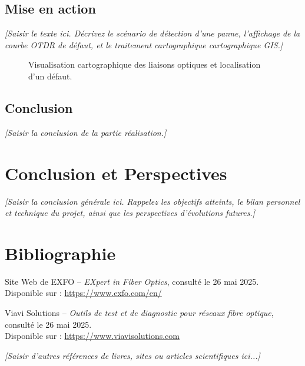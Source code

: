 \documentclass[11pt,a4paper]{article}
\begin{document}
\subsection{Mise en action}
\textit{[Saisir le texte ici. Décrivez le scénario de détection d'une panne, l'affichage de la courbe OTDR de défaut, et le traitement cartographique cartographique GIS.]}

\begin{figure}[H]
    \centering
    \caption{Visualisation cartographique des liaisons optiques et localisation d'un défaut.}
    \label{fig:map}
\end{figure}

\subsection{Conclusion}
\textit{[Saisir la conclusion de la partie réalisation.]}

\newpage

\section{Conclusion et Perspectives}
\textit{[Saisir la conclusion générale ici. Rappelez les objectifs atteints, le bilan personnel et technique du projet, ainsi que les perspectives d'évolutions futures.]}

\newpage

\section*{Bibliographie}

\begin{enumerate}[label={[\arabic*]}]
    \item Site Web de EXFO -- \textit{EXpert in Fiber Optics}, consulté le 26 mai 2025. \\
    Disponible sur : \url{https://www.exfo.com/en/}
    
    \item Viavi Solutions -- \textit{Outils de test et de diagnostic pour réseaux fibre optique}, consulté le 26 mai 2025. \\
    Disponible sur : \url{https://www.viavisolutions.com}
    
    \item \textit{[Saisir d'autres références de livres, sites ou articles scientifiques ici...]}
\end{enumerate}
\end{document}
